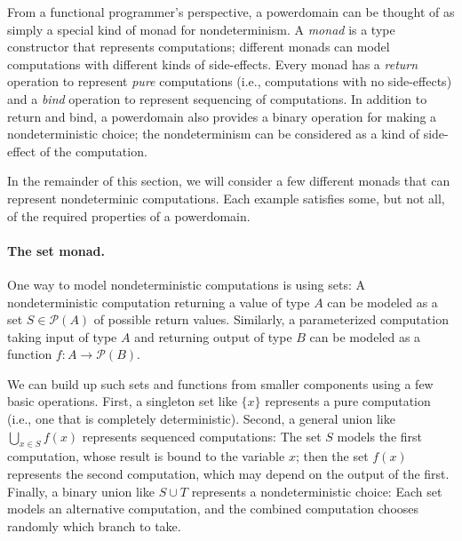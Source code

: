 From a functional programmer's perspective, a powerdomain can be thought of as simply a special kind of monad for nondeterminism. A \emph{monad} is a type constructor that represents computations; different monads can model computations with different kinds of side-effects. Every monad has a \emph{return} operation to represent \emph{pure} computations (i.e., computations with no side-effects) and a \emph{bind} operation to represent sequencing of computations. In addition to return and bind, a powerdomain also provides a binary operation for making a nondeterministic choice; the nondeterminism can be considered as a kind of side-effect of the computation.

In the remainder of this section, we will consider a few different monads that can represent nondeterminic computations. Each example satisfies some, but not all, of the required properties of a powerdomain.

\paragraph{The set monad.} One way to model nondeterministic computations is using sets: A nondeterministic computation returning a value of type $A$ can be modeled as a set $S \in \mathcal{P}(A)$ of possible return values. Similarly, a parameterized computation taking input of type $A$ and returning output of type $B$ can be modeled as a function $f : A \to \mathcal{P}(B)$.

We can build up such sets and functions from smaller components using a few basic operations. First, a singleton set like $\{x\}$ represents a pure computation (i.e., one that is completely deterministic). Second, a general union like $\bigcup_{x \in S}f(x)$ represents sequenced computations: The set $S$ models the first computation, whose result is bound to the variable $x$; then the set $f(x)$ represents the second computation, which may depend on the output of the first. Finally, a binary union like $S \cup T$ represents a nondeterministic choice: Each set models an alternative computation, and the combined computation chooses randomly which branch to take.

